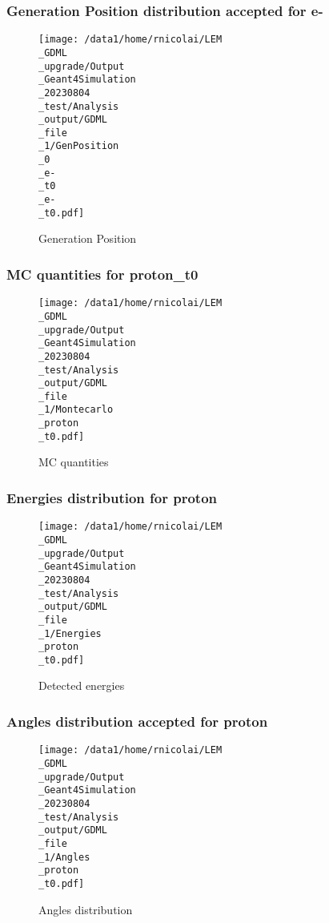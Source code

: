 \documentclass[8pt]{beamer}
\begin{document}
            \begin{frame}
                \frametitle{Generation Position distribution accepted for e-}
            
        \begin{figure}[h]
            \centering
            \texttt{[image: /data1/home/rnicolai/LEM\\\_GDML\\\_upgrade/Output\\\_Geant4Simulation\\\_20230804\\\_test/Analysis\\\_output/GDML\\\_file\\\_1/GenPosition\\\_0\\\_e-\\\_t0\\\_e-\\\_t0.pdf]}
            \caption{Generation Position}
        \end{figure}
        
            \end{frame}
            
            \begin{frame}
                \frametitle{MC quantities for proton\_t0}
            
        \begin{figure}[h]
            \centering
            \texttt{[image: /data1/home/rnicolai/LEM\\\_GDML\\\_upgrade/Output\\\_Geant4Simulation\\\_20230804\\\_test/Analysis\\\_output/GDML\\\_file\\\_1/Montecarlo\\\_proton\\\_t0.pdf]}
            \caption{MC quantities}
        \end{figure}
        
            \end{frame}
            
            \begin{frame}
                \frametitle{Energies distribution for proton}
            
        \begin{figure}[h]
            \centering
            \texttt{[image: /data1/home/rnicolai/LEM\\\_GDML\\\_upgrade/Output\\\_Geant4Simulation\\\_20230804\\\_test/Analysis\\\_output/GDML\\\_file\\\_1/Energies\\\_proton\\\_t0.pdf]}
            \caption{Detected energies}
        \end{figure}
        
            \end{frame}
            
            \begin{frame}
                \frametitle{Angles distribution accepted for proton}
            
        \begin{figure}[h]
            \centering
            \texttt{[image: /data1/home/rnicolai/LEM\\\_GDML\\\_upgrade/Output\\\_Geant4Simulation\\\_20230804\\\_test/Analysis\\\_output/GDML\\\_file\\\_1/Angles\\\_proton\\\_t0.pdf]}
            \caption{Angles distribution}
        \end{figure}
        
            \end{frame}
            
\end{document}
